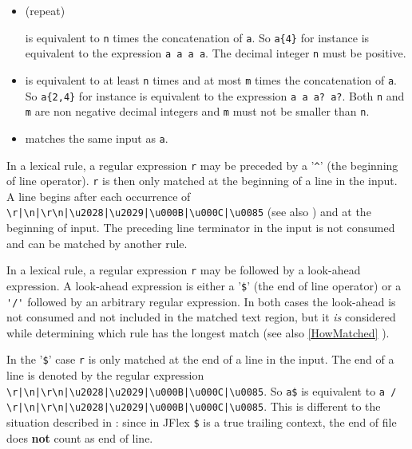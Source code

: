 \documentclass[11pt]{scrartcl}
\newcommand{\bl}{\latex{\symbol{123}}\html{\{}}
\newcommand{\br}{\latex{\symbol{125}}\html{\}}}
\newcommand{\trit}{\em}
\begin{document}
\begin{itemize}
          \item[\texttt{a\bl n\br}] (repeat)          

            is equivalent to \texttt{n} times the concatenation of \texttt{a}.
            So \verb+a{4}+ for instance is equivalent to the expression \texttt{a a a a}.
            The decimal integer \texttt{n} must be positive.          
          
          \item[\texttt{a\bl n,m\br}]          
            is equivalent to at least \texttt{n} times and at most \texttt{m} times the 
            concatenation of \texttt{a}. So \verb+a{2,4}+ for instance is equivalent 
            to the expression \verb+a a a? a?+. Both \texttt{n} and \texttt{m} are non
            negative decimal integers and \texttt{m} must not be smaller than \texttt{n}.
          
          \item[\texttt{( a )}]
            matches the same input as \texttt{a}.
            
        
\end{itemize}
    
In a lexical rule, a regular expression \texttt{r} may be preceded by a
'\verb+^+' (the beginning of line operator). \texttt{r} is then
only matched at the beginning of a line in the input. A line begins
after each occurrence of \verb+\r|\n|\r\n|\u2028|\u2029|\u000B|\u000C|\u0085+ 
(see also \cite{unicode_rep}) and at the beginning of input.  
The preceding line terminator in the input is not consumed and can 
be matched by another rule.

In a lexical rule, a regular expression \texttt{r} may be followed by a
look-ahead expression. A look-ahead expression is either a '\texttt{\$}'
(the end of line operator) or a \verb+'/'+ followed by an arbitrary
regular expression. In both cases the look-ahead is not consumed and
not included in the matched text region, but it {\trit is} considered
while determining which rule has the longest match (see also 
\ref{HowMatched} ). 

In the '\texttt{\$}' case \texttt{r} is only matched at the end of a line in
the input. The end of a line is denoted by the regular expression
\verb+\r|\n|\r\n|\u2028|\u2029|\u000B|\u000C|\u0085+. 
So \verb+a$+ is equivalent to \verb+a / \r|\n|\r\n|\u2028|\u2029|\u000B|\u000C|\u0085+.
This is different to the situation described in \cite{unicode_rep}:
since in JFlex \verb+$+ is a true trailing context, the end of file
does \textbf{not} count as end of line.
\end{document}
